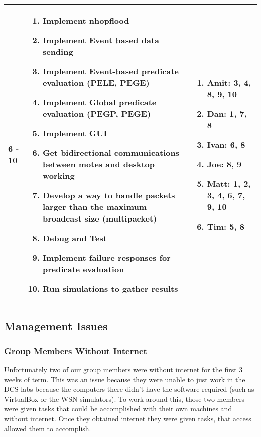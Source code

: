 \begin{center}
\begin{longtable}{| l | p{7.5cm} | p{5cm} |}
	6 - 10 & \begin{enumerate}
		\item Implement nhopflood
		\item Implement Event based data sending
		\item Implement Event-based predicate evaluation (PELE, PEGE)
		\item Implement Global predicate evaluation (PEGP, PEGE)
		\item Implement GUI
		\item Get bidirectional communications between motes and desktop working
		\item Develop a way to handle packets larger than the maximum broadcast size (multipacket)
		\item Debug and Test
		\item Implement failure responses for predicate evaluation
		\item Run simulations to gather results
		\end{enumerate} &
	\begin{enumerate}
		\item[] Amit: 3, 4, 8, 9, 10
		\item[] Dan: 1, 7, 8
		\item[] Ivan: 6, 8
		\item[] Joe: 8, 9
		\item[] Matt: 1, 2, 3, 4, 6, 7, 9, 10
		\item[] Tim: 5, 8
	\end{enumerate}
	\\ \hline
	
	\end{longtable}
\end{center}



\subsection{Management Issues}

\subsubsection{Group Members Without Internet}
Unfortunately two of our group members were without internet for the first 3 weeks of term. This was an issue because they were unable to just work in the DCS labs because the computers there didn't have the software required (such as VirtualBox or the WSN simulators). To work around this, those two members were given tasks that could be accomplished with their own machines and without internet. Once they obtained internet they were given tasks, that access allowed them to accomplish.

